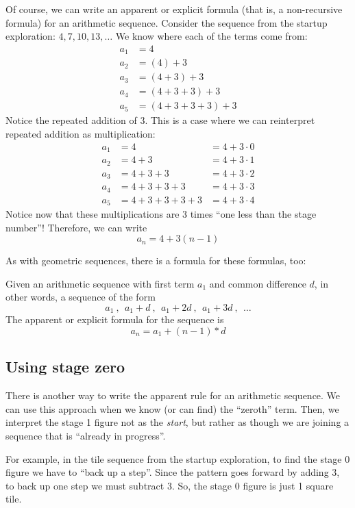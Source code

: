 Of course, we can write an apparent or explicit formula (that is, a non-recursive formula) for an arithmetic sequence. Consider the sequence from the startup exploration: $4, 7, 10, 13, \dotsc$ We know where each of the terms come from:
\[\begin{aligned}
a_1 &= 4
\\
a_2 &= (4) + 3
\\
a_3 &= (4 + 3) + 3
\\
a_4 &= (4 + 3 + 3) + 3
\\
a_5 &= (4 + 3 + 3 + 3) + 3
\end{aligned}\]
Notice the repeated addition of 3. This is a case where we can reinterpret repeated addition as multiplication:
\[\begin{aligned}
a_1 &= 4 				&= 4 + 3\cdot0 
\\
a_2 &= 4 +3			&= 4 + 3\cdot1
\\
a_3 &= 4 +3 +3			&= 4 + 3\cdot2
\\
a_4 &= 4 +3 +3 +3		&= 4 + 3\cdot3
\\
a_5 &= 4 +3 +3 +3 +3	&= 4 + 3\cdot4
\end{aligned}\]
Notice now that these multiplications are 3 times ``one less than the stage number''! Therefore, we can write \[a_n = 4 + 3 (n-1)\]

As with geometric sequences, there is a formula for these formulas, too:

\begin{boxeddef}
Given an arithmetic sequence with first term $a_1$ and common difference $d$, in other words, a sequence of the form \[a_1~,~~ a_1 + d~,~~ a_1 + 2d~,~~ a_1 + 3d~,~~ \dotsc\] The apparent or explicit formula for the sequence is \[a_n = a_1 + (n-1) \ast d\]
\end{boxeddef}

\subsection{Using stage zero}

There is another way to write the apparent rule for an arithmetic sequence. We can use this approach when we know (or can find) the ``zeroth'' term. Then, we interpret the stage 1 figure not as the \textit{start}, but rather as though we are joining a sequence that is ``already in progress''.

For example, in the tile sequence from the startup exploration, to find the stage 0 figure we have to ``back up a step''. Since the pattern goes forward by adding 3, to back up one step we must subtract 3. So, the stage 0 figure is just 1 square tile.

